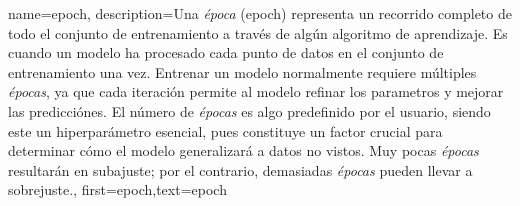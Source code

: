 
{name={epoch},
	description={Una \emph{época} (epoch) representa un recorrido completo de todo el conjunto de entrenamiento a través de algún algoritmo de aprendizaje. Es cuando un modelo ha procesado cada punto de datos en el conjunto de entrenamiento una vez. 
	Entrenar un modelo normalmente requiere múltiples \emph{épocas}, ya que cada iteración permite al modelo refinar los parametros y mejorar las predicciónes. El número de \emph{épocas} es algo predefinido por el usuario, 
	siendo este un hiperparámetro esencial, pues constituye un factor crucial para determinar cómo el modelo generalizará a datos no vistos. Muy pocas \emph{épocas} resultarán en subajuste; por el contrario, demasiadas \emph{épocas} pueden llevar a sobrejuste.},
	first={epoch},text={epoch}
}



